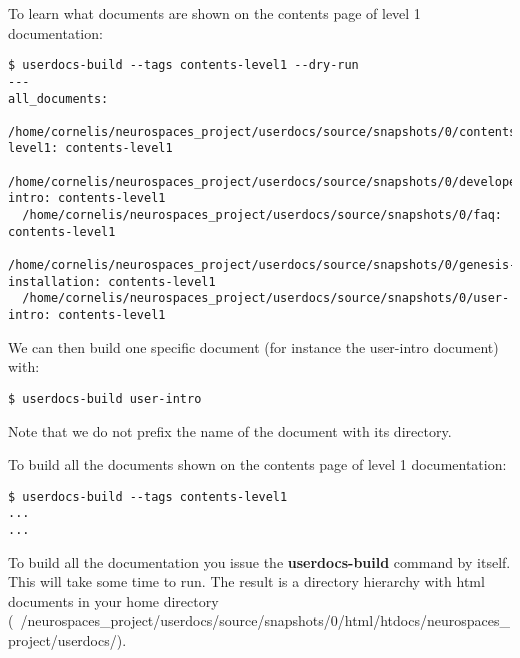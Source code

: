 \documentclass[12pt]{article}
\begin{document}
To learn what documents are shown on the contents page of level 1
documentation:

\begin{verbatim}
$ userdocs-build --tags contents-level1 --dry-run
---
all_documents:
  /home/cornelis/neurospaces_project/userdocs/source/snapshots/0/contents-level1: contents-level1
  /home/cornelis/neurospaces_project/userdocs/source/snapshots/0/developer-intro: contents-level1
  /home/cornelis/neurospaces_project/userdocs/source/snapshots/0/faq: contents-level1
  /home/cornelis/neurospaces_project/userdocs/source/snapshots/0/genesis-installation: contents-level1
  /home/cornelis/neurospaces_project/userdocs/source/snapshots/0/user-intro: contents-level1
\end{verbatim}

We can then build one specific document (for instance the user-intro
document) with:

\begin{verbatim}
$ userdocs-build user-intro
\end{verbatim}

Note that we do not prefix the name of the document with its
directory.

To build all the documents shown on the contents page of level 1
documentation:

\begin{verbatim}
$ userdocs-build --tags contents-level1
...
...
\end{verbatim}

To build all the documentation you issue the {\bf userdocs-build}
command by itself.  This will take some time to run.  The result is a
directory hierarchy with html documents in your home directory
(~/neurospaces\_project/userdocs/source/snapshots/0/html/htdocs/neurospaces\_project/userdocs/).
\end{document}

